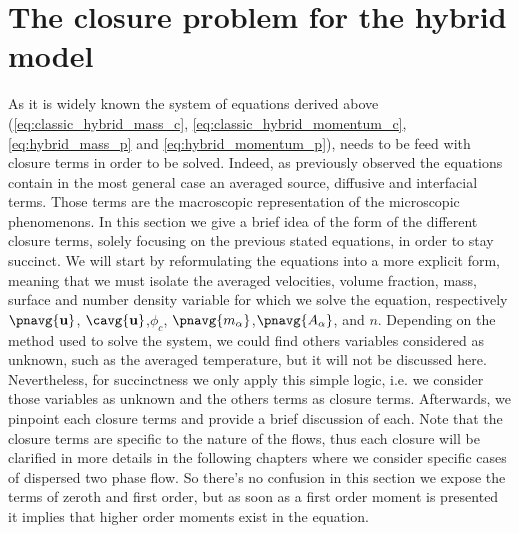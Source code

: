 \section{The closure problem for the hybrid model}

As it is widely known the system of equations derived above (\ref{eq:classic_hybrid_mass_c}, \ref{eq:classic_hybrid_momentum_c}, \ref{eq:hybrid_mass_p} and \ref{eq:hybrid_momentum_p}), needs to be feed with closure terms in order to be solved. 
Indeed, as previously observed the equations contain in the most general case an averaged source, diffusive and interfacial terms. 
Those terms are the macroscopic representation of the microscopic phenomenons.
In this section we give a brief idea of the form of the different closure terms, solely focusing on the previous stated equations, in order to stay succinct.
We will start by reformulating the equations into a more explicit form, meaning that we must isolate the averaged velocities, volume fraction, mass, surface and number density variable for which we solve the equation, respectively $\pnavg{\textbf{u}}$, $\cavg{\textbf{u}}$,$\phi_c$, $\pnavg{m_\alpha}$,$\pnavg{A_\alpha}$, and $n$. 
Depending on the method used to solve the system, we could find others variables considered as unknown, such as the averaged temperature, but it will not be discussed here.
Nevertheless, for succinctness we only apply this simple logic, i.e. we consider those variables as unknown and the others terms as closure terms. 
Afterwards, we pinpoint each closure terms and provide a brief discussion of each. 
Note that the closure terms are specific to the nature of the flows, thus each closure will be clarified in more details in the following chapters where we consider specific cases of dispersed two phase flow. 
So there's no confusion in this section we expose the terms of zeroth and first order, but as soon as a first order moment is presented it implies that higher order moments exist in the equation.

